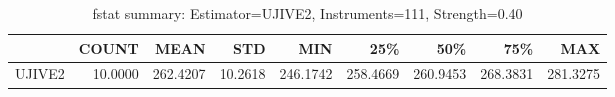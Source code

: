 \begin{table}[ht]
\centering
\caption{fstat summary: Estimator=UJIVE2, Instruments=111, Strength=0.40}
\begin{tabular}{lrrrrrrrr}
\toprule
 & COUNT & MEAN & STD & MIN & 25\% & 50\% & 75\% & MAX \\
\midrule
UJIVE2 & 10.0000 & 262.4207 & 10.2618 & 246.1742 & 258.4669 & 260.9453 & 268.3831 & 281.3275 \\
\bottomrule
\end{tabular}
\end{table}
